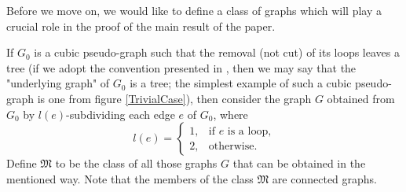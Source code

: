 \documentclass[fleqn,12pt,twoside]{article}
\begin{document}
Before we move on, we would like to define a class of graphs which
will play a crucial role in the proof of the main result of the
paper.

If $G_{0}$ is a cubic pseudo-graph such that the removal (not cut)
of its loops leaves a tree (if we adopt the convention presented in
\cite{Harary}, then we may say that the "underlying graph" of
$G_{0}$ is a tree; the simplest example of such a cubic pseudo-graph
is one from figure \ref{TrivialCase}), then consider the graph $G$
obtained from $G_{0}$ by $l(e)$-subdividing each edge $e$ of
$G_{0}$, where
\begin{equation*}
l(e)=\left\{
\begin{array}{ll}
1, & \text{if }e\text{ is a loop,} \\
2, & \text{otherwise.}\end{array}\right.
\end{equation*}Define $\mathfrak{M}$ to be the class of all those graphs $G$ that
can be
obtained in the mentioned way. Note that the members of the class $\mathfrak{M}$ are connected graphs.
\end{document}
